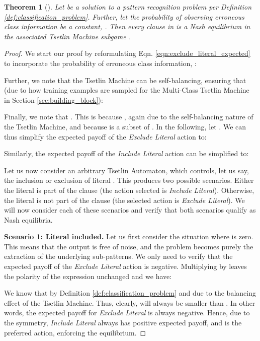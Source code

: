 \documentclass[11pt,a4paper]{article}
\newtheorem{mytheorem}{Theorem}
\begin{document}
\begin{mytheorem}[]\label{theorem:nash_equilibrium}
Let  be a solution to a pattern recognition problem per Definition \ref{def:classification_problem}. Further, let the probability of observing erroneous class information be a constant, . Then every clause  in  is a Nash equilibrium in the associated Tsetlin Machine subgame .
\end{mytheorem}
\begin{proof}

We start our proof by reformulating Eqn. \ref{eqn:exclude_literal_expected} to incorporate the probability of erroneous class information, :

Further, we note that the Tsetlin Machine can be self-balancing, ensuring that  (due to how training examples are sampled for the Multi-Class Tsetlin Machine in Section \ref{sec:building_block}):

Finally, we note that . This is because , again due to the self-balancing nature of the Tsetlin Machine, and because  is a subset of . In the following, let . We can thus simplify the expected payoff of the \emph{Exclude Literal} action to:

Similarly, the expected payoff of the \emph{Include Literal} action can be simplified to:


Let us now consider an arbitrary Tsetlin Automaton, which controls, let us say, the inclusion or exclusion of literal . This produces two possible scenarios. Either the literal  is part of the clause  (the action selected is \emph{Include Literal}). Otherwise, the literal is not part of the clause  (the selected action is \emph{Exclude Literal}). We will now consider each of these scenarios and verify that both scenarios qualify as Nash equilibria.

{\bf Scenario 1: Literal included.} Let us first consider the situation where  is zero. This means that the output  is free of noise, and the problem becomes purely the extraction of the underlying sub-patterns. We only need to verify that the expected payoff of the \emph{Exclude Literal} action is negative. Multiplying by  leaves the polarity of the expression unchanged and we have: 

We know that  by Definition \ref{def:classification_problem} and due to the balancing effect of the Tsetlin Machine. Thus, clearly,  will always be smaller than . In other words, the expected payoff for \emph{Exclude Literal} is always negative. Hence, due to the symmetry, \emph{Include Literal} always has positive expected payoff, and is the preferred action, enforcing the equilibrium.


\end{proof}
\end{document}
